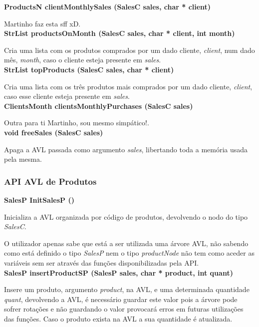 \documentclass[12pt] {article}
\begin{document}
\noindent \textbf {ProductsN clientMonthlySales (SalesC sales, char * client)}
\par Martinho faz esta sff xD. \\

\noindent \textbf {StrList productsOnMonth (SalesC sales, char * client, int month)}
\par Cria uma lista com os produtos comprados por um dado cliente, \emph{client}, num dado mês, \emph{month}, 
caso o cliente esteja presente em \emph{sales}. \\

\noindent \textbf {StrList topProducts (SalesC sales, char * client)}
\par Cria uma lista com os três produtos mais comprados por um dado cliente, \emph{client}, caso esse cliente 
esteja presente em \emph{sales}. \\

\noindent \textbf {ClientsMonth clientsMonthlyPurchases (SalesC sales)}
\par Outra para ti Martinho, sou mesmo simpático!. \\

\noindent \textbf {void freeSales (SalesC sales)}
\par Apaga a AVL passada como argumento \emph{sales}, libertando toda a memória usada pela mesma. \\

 \subsubsection{API AVL de Produtos}
\noindent \textbf {SalesP InitSalesP ()}
\par Inicializa a AVL organizada por código de produtos, devolvendo o nodo do tipo \emph{SalesC}.
\par O utilizador apenas sabe que está a ser utilizada uma árvore AVL, não sabendo como está definido o tipo 
\emph{SalesP} nem o tipo \emph{productNode} não tem como aceder as variáveis sem ser através das funções 
disponibilizadas pela API. \\

\newpage
\noindent \textbf {SalesP insertProductSP (SalesP sales, char * product, int quant)}
\par Insere um produto, argumento \emph{product}, na AVL, e uma determinada quantidade \emph{quant}, 
devolvendo a AVL, é necessário guardar este valor pois a árvore pode sofrer rotações e não guardando o valor 
provocará erros em futuras utilizações das funções. Caso o produto exista na AVL a sua quantidade é atualizada.\\
\end{document}
